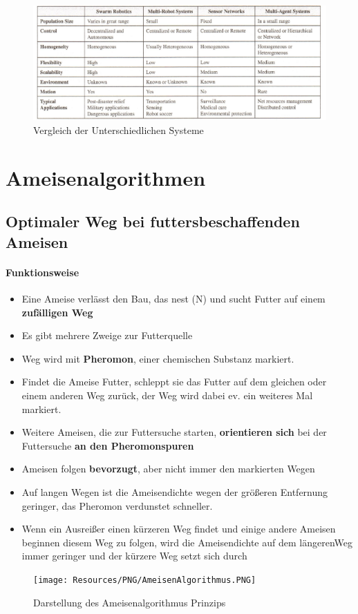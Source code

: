 \begin{figure}
	\includegraphics[width=\textwidth]
		{Resources/PNG/vergleich-mrs-swarmrobotic.png}
	\caption{Vergleich der Unterschiedlichen Systeme}
\end{figure}


\section{Ameisenalgorithmen}
\subsection{Optimaler Weg bei futtersbeschaffenden Ameisen}
\paragraph{Funktionsweise}
\begin{itemize}
	\item Eine Ameise verlässt den Bau, das nest (N) und sucht Futter auf einem
		\textbf{zufälligen Weg}
	\item Es gibt mehrere Zweige zur Futterquelle
	\item Weg wird mit \textbf{Pheromon}, einer chemischen Substanz markiert.
	\item Findet die Ameise Futter, schleppt sie das Futter auf dem gleichen oder
		einem anderen Weg zurück, der Weg wird dabei ev. ein weiteres Mal markiert.
	\item Weitere Ameisen, die zur Futtersuche starten, \textbf{orientieren sich}
		bei der Futtersuche \textbf{an den Pheromonspuren}
	\item Ameisen folgen \textbf{bevorzugt}, aber nicht immer den markierten Wegen
	\item Auf langen Wegen ist die Ameisendichte wegen der größeren Entfernung
		geringer, das Phero\-mon verdunstet schneller.
	\item Wenn ein Ausreißer einen kürzeren Weg findet und einige andere Ameisen
		beginnen diesem Weg zu folgen, wird die Ameisendichte auf dem längerenWeg
		immer geringer und der kürzere Weg setzt sich durch
\end{itemize}
\begin{figure}[H]
	\begin{center}
		\texttt{[image: Resources/PNG/AmeisenAlgorithmus.PNG]}
		\caption{Darstellung des Ameisenalgorithmus Prinzips}
		\label{fig:PNG/AmeisenAlgorithmus.PNG}
	\end{center}
\end{figure}

